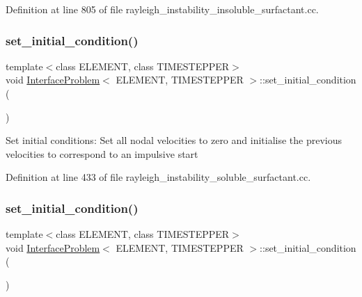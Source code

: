 Definition at line 805 of file rayleigh\+\_\+instability\+\_\+insoluble\+\_\+surfactant.\+cc.

\mbox{\label{classInterfaceProblem_a0d3af8378c4f0a6e38636be958c300d5}} 
\subsubsection{\texorpdfstring{set\+\_\+initial\+\_\+condition()}{set\_initial\_condition()}\hspace{0.1cm}{\footnotesize\ttfamily [1/2]}}
{\footnotesize\ttfamily template$<$class E\+L\+E\+M\+E\+NT, class T\+I\+M\+E\+S\+T\+E\+P\+P\+ER$>$ \\
void \hyperlink{classInterfaceProblem}{Interface\+Problem}$<$ E\+L\+E\+M\+E\+NT, T\+I\+M\+E\+S\+T\+E\+P\+P\+ER $>$\+::set\+\_\+initial\+\_\+condition (\begin{DoxyParamCaption}{ }\end{DoxyParamCaption})\hspace{0.3cm}{\ttfamily [inline]}}

Set initial conditions\+: Set all nodal velocities to zero and initialise the previous velocities to correspond to an impulsive start 

Definition at line 433 of file rayleigh\+\_\+instability\+\_\+soluble\+\_\+surfactant.\+cc.

\mbox{\label{classInterfaceProblem_a0d3af8378c4f0a6e38636be958c300d5}} 
\subsubsection{\texorpdfstring{set\+\_\+initial\+\_\+condition()}{set\_initial\_condition()}\hspace{0.1cm}{\footnotesize\ttfamily [2/2]}}
{\footnotesize\ttfamily template$<$class E\+L\+E\+M\+E\+NT, class T\+I\+M\+E\+S\+T\+E\+P\+P\+ER$>$ \\
void \hyperlink{classInterfaceProblem}{Interface\+Problem}$<$ E\+L\+E\+M\+E\+NT, T\+I\+M\+E\+S\+T\+E\+P\+P\+ER $>$\+::set\+\_\+initial\+\_\+condition (\begin{DoxyParamCaption}{ }\end{DoxyParamCaption})\hspace{0.3cm}{\ttfamily [inline]}}

